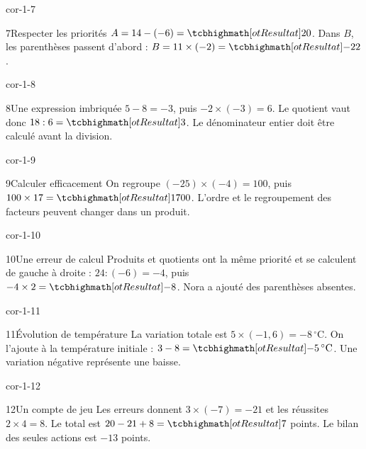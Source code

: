 \begin{blocLivre}{cor-1-7}\begin{corrige}{7}{Respecter les priorités}
$A=14-(-6)=\res{20}$. Dans $B$, les parenthèses passent d’abord : $B=11\times(-2)=\res{-22}$.
\end{corrige}\end{blocLivre}
\begin{blocLivre}{cor-1-8}\begin{corrige}{8}{Une expression imbriquée}
$5-8=-3$, puis $-2\times(-3)=6$. Le quotient vaut donc $18:6=\res3$. Le dénominateur entier doit être calculé avant la division.
\end{corrige}\end{blocLivre}
\begin{blocLivre}{cor-1-9}\begin{corrige}{9}{Calculer efficacement}
On regroupe $(-25)\times(-4)=100$, puis $100\times17=\res{1700}$. L’ordre et le regroupement des facteurs peuvent changer dans un produit.
\end{corrige}\end{blocLivre}
\begin{blocLivre}{cor-1-10}\begin{corrige}{10}{Une erreur de calcul}
Produits et quotients ont la même priorité et se calculent de gauche à droite : $24:(-6)=-4$, puis $-4\times2=\res{-8}$. Nora a ajouté des parenthèses absentes.
\end{corrige}\end{blocLivre}
\begin{blocLivre}{cor-1-11}\begin{corrige}{11}{Évolution de température}
La variation totale est $5\times(-1{,}6)=-8\,^\circ$C. On l’ajoute à la température initiale : $3-8=\res{-5\,^\circ\mathrm C}$. Une variation négative représente une baisse.
\end{corrige}\end{blocLivre}
\begin{blocLivre}{cor-1-12}\begin{corrige}{12}{Un compte de jeu}
Les erreurs donnent $3\times(-7)=-21$ et les réussites $2\times4=8$. Le total est $20-21+8=\res7$ points. Le bilan des seules actions est $-13$ points.
\end{corrige}\end{blocLivre}

